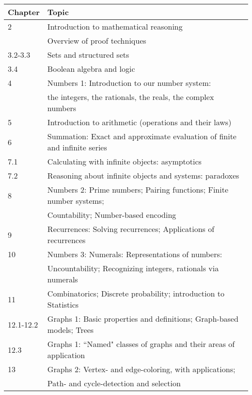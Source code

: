  \bigskip

\noindent
\begin{tabular}{|l|l|}
\hline
 {\bf Chapter} & {\bf Topic} \\
\hline
\hline
2    & Introduction to mathematical reasoning \\
& Overview of proof techniques \\
3.2-3.3  & Sets and structured sets  \\
3.4   & Boolean algebra and logic \\
4  & Numbers 1: Introduction to our number system: \\
            & \hspace*{.67in}the integers, the rationals, the reals, the complex numbers \\
5  &Introduction to arithmetic (operations and their laws) \\
6  & Summation: Exact and approximate evaluation of finite and infinite series  \\
7.1 & Calculating with infinite objects: asymptotics \\
7.2  & Reasoning about infinite objects and systems: paradoxes \\
8  & Numbers 2: Prime numbers; Pairing functions; Finite number systems; \\
            & \hspace*{.67in}Countability; Number-based encoding  \\
9  & Recurrences: Solving recurrences; Applications of recurrences \\
10 & Numbers 3: Numerals: Representations of numbers: \\
             & \hspace*{.67in}Uncountability; Recognizing integers, rationals via numerals \\
11  & Combinatorics; Discrete probability; introduction to Statistics \\
12.1-12.2 & Graphs 1: Basic properties and definitions; Graph-based models; Trees \\
12.3 & Graphs 1: ``Named" classes of graphs and their areas of application \\
13 & Graphs 2: Vertex- and edge-coloring, with applications; \\
             & \hspace*{.67in}Path- and cycle-detection and selection \\
\hline
\end{tabular}

\bigskip

